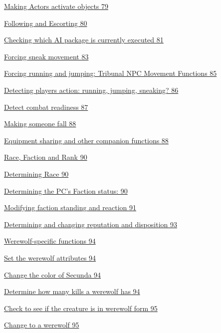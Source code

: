 \documentclass[
]{article}
\begin{document}
\protect\hyperlink{making-actors-activate-objects}{Making Actors
activate objects 79}

\protect\hyperlink{following-and-escorting}{Following and Escorting 80}

\protect\hyperlink{checking-which-ai-package-is-currently-executed}{Checking
which AI package is currently executed 81}

\protect\hyperlink{forcing-sneak-movement}{Forcing sneak movement 83}

\protect\hyperlink{forcing-running-and-jumping-tribunal-npc-movement-functions}{Forcing
running and jumping: Tribunal NPC Movement Functions 85}

\protect\hyperlink{detecting-players-action-running-jumping-sneaking}{Detecting
players action: running, jumping, sneaking? 86}

\protect\hyperlink{detect-combat-readiness}{Detect combat readiness 87}

\protect\hyperlink{section-7}{Making someone fall 88}

\protect\hyperlink{equipment-sharing-and-other-companion-functions}{Equipment
sharing and other companion functions 88}

\protect\hyperlink{race-faction-and-rank}{Race, Faction and Rank 90}

\protect\hyperlink{determining-race}{Determining Race 90}

\protect\hyperlink{determining-the-pcs-faction-status}{Determining the
PC's Faction status: 90}

\protect\hyperlink{modifying-faction-standing-and-reaction}{Modifying
faction standing and reaction 91}

\protect\hyperlink{determining-and-changing-reputation-and-disposition}{Determining
and changing reputation and disposition 93}

\protect\hyperlink{werewolf-specific-functions}{Werewolf-specific
functions 94}

\protect\hyperlink{set-the-werewolf-attributes}{Set the werewolf
attributes 94}

\protect\hyperlink{change-the-color-of-secunda}{Change the color of
Secunda 94}

\protect\hyperlink{determine-how-many-kills-a-werewolf-has}{Determine
how many kills a werewolf has 94}

\protect\hyperlink{check-to-see-if-the-creature-is-in-werewolf-form}{Check
to see if the creature is in werewolf form 95}

\protect\hyperlink{change-to-a-werewolf}{Change to a werewolf 95}
\end{document}
